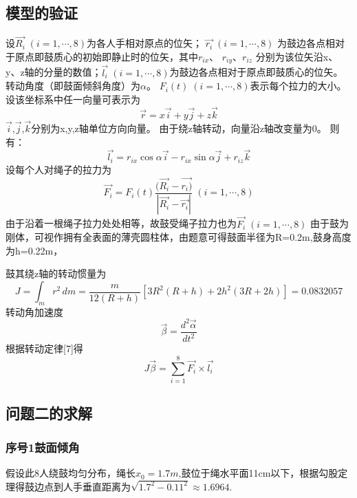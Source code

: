 \documentclass[UTF8]{article}
\begin{document}
\subsection{模型的验证}
设$\overrightarrow{R_{i}}\;(i=1,\cdots,8)$为各人手相对原点的位矢；
$\overrightarrow{r_{i}}\;(i=1,\cdots,8)$ 为鼓边各点相对于原点即鼓质心的初始即静止时的位矢，其中$r_{ix}$、
$r_{iy}$、$r_{iz}$ 分别为该位矢沿x、y、z轴的分量的数值；$\overrightarrow{l_{i}}\;(i=1,\cdots,8)$为鼓边各点相对于原点即鼓质心的位矢。
转动角度（即鼓面倾斜角度）为$\alpha$。
$F_{i}(t)\;(i=1,\cdots,8)$表示每个拉力的大小。
设该坐标系中任一向量可表示为
\begin{equation}
\overrightarrow{r}=x\overrightarrow{i}+y\overrightarrow{j}+z\overrightarrow{k}
\end{equation}
$\overrightarrow{i}$,$\overrightarrow{j}$,$\overrightarrow{k}$分别为x,y,z轴单位方向向量。
由于绕z轴转动，向量沿z轴改变量为0。
则有：
\begin{equation}
\overrightarrow{l_{i}}=r_{ix}\cos\alpha\overrightarrow{i}-r_{ix}\sin\alpha\overrightarrow{j}+r_{iz}\overrightarrow{k}
\end{equation}
设每个人对绳子的拉力为
\begin{equation}
\overrightarrow{F_{i}}=F_{i}(t)\frac{(\overrightarrow{R_{i}}-\overrightarrow{r_{i})}}{\left |\overrightarrow{R_{i}}-\overrightarrow{r_{i}}\right|}\;(i=1,\cdots,8)
\end{equation}
由于沿着一根绳子拉力处处相等，故鼓受绳子拉力也为$\overrightarrow{F_{i}}\;(i=1,\cdots,8)$
由于鼓为刚体，可视作拥有全表面的薄壳圆柱体，由题意可得鼓面半径为R=0.2m,鼓身高度为h=0.22m，

鼓其绕z轴的转动惯量为
\begin{equation}
J=\int_{m}r^2\,dm=\frac{m}{12(R+h)}[3R^{2}(R+h)+2h^2(3R+2h)]=0.0832057
\end{equation}
转动角加速度
\begin{equation}
\overrightarrow{\beta}=\frac{d^{2}\overrightarrow{\alpha}}{dt^{2}}
\end{equation}
根据转动定律[7]得
\begin{equation}
J\overrightarrow{\beta}=\sum_{i=1}^{8} \overrightarrow{F_{i}}\times\overrightarrow{l_{i}}
\end{equation}
\subsection{问题二的求解}
\subsubsection{序号1鼓面倾角}
假设此8人绕鼓均匀分布，绳长$x_0=1.7m$,鼓位于绳水平面11cm以下，根据勾股定理得鼓边点到人手垂直距离为$\sqrt{1.7^2-0.11^2}\approx 1.6964$.
\end{document}
